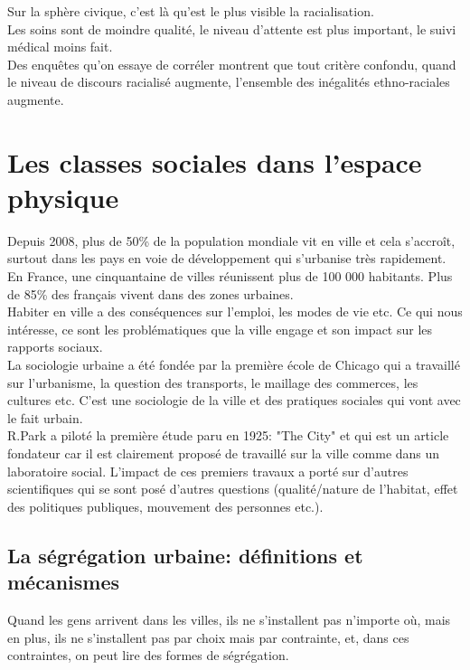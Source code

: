 \documentclass[10pt, a4paper, openany]{book}
\begin{document}
Sur la sphère civique, c'est là qu'est le plus visible la racialisation. \\
Les soins sont de moindre qualité, le niveau d'attente est plus important, le suivi médical moins fait. \\
Des enquêtes qu'on essaye de corréler montrent que tout critère confondu, quand le niveau de discours racialisé augmente, l'ensemble des inégalités ethno-raciales augmente. 

\chapter{Les classes sociales dans l'espace physique}

Depuis 2008, plus de 50\% de la population mondiale vit en ville et cela s'accroît, surtout dans les pays en voie de développement qui s'urbanise très rapidement. \\
En France, une cinquantaine de villes réunissent plus de 100 000 habitants. Plus de 85\% des français vivent dans des zones urbaines. \\
Habiter en ville a des conséquences sur l'emploi, les modes de vie etc. Ce qui nous intéresse, ce sont les problématiques que la ville engage et son impact sur les rapports sociaux. \\
La sociologie urbaine a été fondée par la première école de Chicago qui a travaillé sur l'urbanisme, la question des transports, le maillage des commerces, les cultures etc. C'est une sociologie de la ville et des pratiques sociales qui vont avec le fait urbain. \\
R.Park a piloté la première étude paru en 1925: "The City" et qui est un article fondateur car il est clairement proposé de travaillé sur la ville comme dans un laboratoire social. L'impact de ces premiers travaux a porté sur d'autres scientifiques qui se sont posé d'autres questions (qualité/nature de l'habitat, effet des politiques publiques, mouvement des personnes etc.).


\section{La ségrégation urbaine: définitions et mécanismes}

Quand les gens arrivent dans les villes, ils ne s'installent pas n'importe où, mais en plus, ils ne s'installent pas par choix mais par contrainte, et, dans ces contraintes, on peut lire des formes de ségrégation. \\
\end{document}
